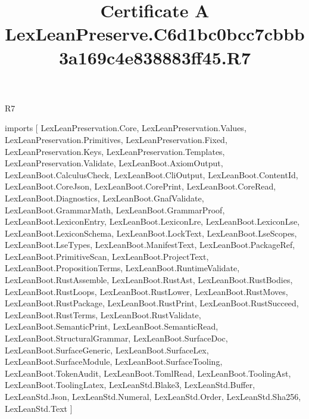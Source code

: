 \begin{lexlean}{R7}
\title{Certificate A LexLeanPreserve.C6d1bc0bcc7cbbb3a169c4e838883ff45.R7}
\begin{coremodule}
imports [
  LexLeanPreservation.Core,
  LexLeanPreservation.Values,
  LexLeanPreservation.Primitives,
  LexLeanPreservation.Fixed,
  LexLeanPreservation.Keys,
  LexLeanPreservation.Templates,
  LexLeanPreservation.Validate,
  LexLeanBoot.AxiomOutput,
  LexLeanBoot.CalculusCheck,
  LexLeanBoot.CliOutput,
  LexLeanBoot.ContentId,
  LexLeanBoot.CoreJson,
  LexLeanBoot.CorePrint,
  LexLeanBoot.CoreRead,
  LexLeanBoot.Diagnostics,
  LexLeanBoot.GnafValidate,
  LexLeanBoot.GrammarMath,
  LexLeanBoot.GrammarProof,
  LexLeanBoot.LexiconEntry,
  LexLeanBoot.LexiconLre,
  LexLeanBoot.LexiconLse,
  LexLeanBoot.LexiconSchema,
  LexLeanBoot.LockText,
  LexLeanBoot.LseScopes,
  LexLeanBoot.LseTypes,
  LexLeanBoot.ManifestText,
  LexLeanBoot.PackageRef,
  LexLeanBoot.PrimitiveScan,
  LexLeanBoot.ProjectText,
  LexLeanBoot.PropositionTerms,
  LexLeanBoot.RuntimeValidate,
  LexLeanBoot.RustAssemble,
  LexLeanBoot.RustAst,
  LexLeanBoot.RustBodies,
  LexLeanBoot.RustLoops,
  LexLeanBoot.RustLower,
  LexLeanBoot.RustMoves,
  LexLeanBoot.RustPackage,
  LexLeanBoot.RustPrint,
  LexLeanBoot.RustSucceed,
  LexLeanBoot.RustTerms,
  LexLeanBoot.RustValidate,
  LexLeanBoot.SemanticPrint,
  LexLeanBoot.SemanticRead,
  LexLeanBoot.StructuralGrammar,
  LexLeanBoot.SurfaceDoc,
  LexLeanBoot.SurfaceGeneric,
  LexLeanBoot.SurfaceLex,
  LexLeanBoot.SurfaceModule,
  LexLeanBoot.SurfaceTooling,
  LexLeanBoot.TokenAudit,
  LexLeanBoot.TomlRead,
  LexLeanBoot.ToolingAst,
  LexLeanBoot.ToolingLatex,
  LexLeanStd.Blake3,
  LexLeanStd.Buffer,
  LexLeanStd.Json,
  LexLeanStd.Numeral,
  LexLeanStd.Order,
  LexLeanStd.Sha256,
  LexLeanStd.Text
]


\end{coremodule}
\end{lexlean}
